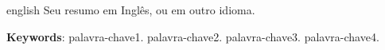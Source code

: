 \def \palavraschavesIngles{palavra-chave1. palavra-chave2. palavra-chave3. palavra-chave4.}
\begin{resumo} 
\begin{otherlanguage*}{english}
Seu resumo em Inglês, ou em outro idioma.

\vspace{\onelineskip} 

\noindent \textbf{Keywords}: \palavraschavesIngles 

\end{otherlanguage*} 
\end{resumo} 